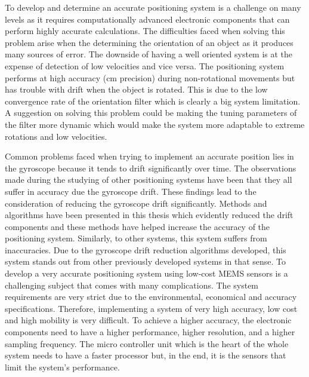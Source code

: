 To develop and determine an accurate positioning system is a challenge on many levels as it requires computationally advanced electronic components that can perform highly accurate calculations. The difficulties faced when solving this problem arise when the determining the orientation of an object as it produces many sources of error. The downside of having a well oriented system is at the expense of detection of low velocities and vice versa. The positioning system performs at high accuracy (cm precision) during non-rotational movements but has trouble with drift when the object is rotated. This is due to the low convergence rate of the orientation filter which is clearly a big system limitation. A suggestion on solving this problem could be making the tuning parameters of the filter more dynamic which would make the system more adaptable to extreme rotations and low velocities.

Common problems faced when trying to implement an accurate position lies in the gyroscope because it tends to drift significantly over time. The observations made during the studying of other positioning systems have been that they all suffer in accuracy due the gyroscope drift. These findings lead to the consideration of reducing the gyroscope drift significantly. Methods and algorithms have been presented in this thesis which evidently reduced the drift components and these methods have helped increase the accuracy of the positioning system. Similarly, to other systems, this system suffers from inaccuracies. Due to the gyroscope drift reduction algorithms developed, this system stands out from other previously developed systems in that sense. To develop a very accurate positioning system using low-cost MEMS sensors is a challenging subject that comes with many complications. The system requirements are very strict due to the environmental, economical and accuracy specifications. Therefore, implementing a system of very high accuracy, low cost and high mobility is very difficult. To achieve a higher accuracy, the electronic components need to have a higher performance, higher resolution, and a higher sampling frequency. The micro controller unit which is the heart of the whole system needs to have a faster processor but, in the end, it is the sensors that limit the system's performance.
